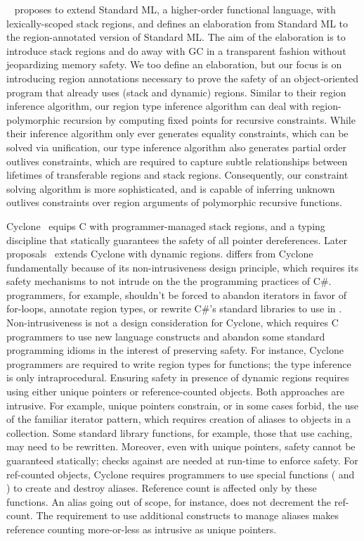 ~\cite{tofte97} proposes to extend Standard ML, a higher-order
functional language, with lexically-scoped stack regions, and defines
an elaboration from Standard ML to the region-annotated version of
Standard ML. The aim of the elaboration is to introduce stack regions
and do away with GC in a transparent fashion without jeopardizing
memory safety. We too define an elaboration, but our focus is on
introducing region annotations necessary to prove the safety of an
object-oriented program that already uses (stack and dynamic) regions.
Similar to their region inference algorithm, our region type inference
algorithm can deal with region-polymorphic recursion by computing
fixed points for recursive constraints. While their inference
algorithm only ever generates equality constraints, which can be
solved via unification, our type inference algorithm also generates
partial order outlives constraints, which are required to capture
subtle relationships between lifetimes of transferable regions and
stack regions. Consequently, our constraint solving algorithm is more
sophisticated, and is capable of inferring unknown outlives
constraints over region arguments of polymorphic recursive functions.

Cyclone~\cite{cyclone02} equips C with programmer-managed stack
regions, and a typing discipline that statically guarantees the safety
of all pointer dereferences. Later
proposals~\cite{cyclone04,cycloneSCP} extends Cyclone with dynamic
regions. \name differs from Cyclone fundamentally because of its
non-intrusiveness design principle, which requires its safety
mechanisms to not intrude on the the programming practices of C\#.
\name programmers, for example, shouldn’t be forced to abandon
iterators in favor of for-loops, annotate region types, or rewrite
C\#'s standard libraries to use in \name.  Non-intrusiveness is not a
design consideration for Cyclone, which requires C programmers to use
new language constructs and abandon some standard programming idioms
in the interest of preserving safety. For instance, Cyclone
programmers are required to write region types for functions; the type
inference is only intraprocedural. Ensuring safety in presence of
dynamic regions requires using either unique pointers or
reference-counted objects.  Both approaches are intrusive. For
example, unique pointers constrain, or in some cases forbid, the use
of the familiar iterator pattern, which requires creation of aliases
to objects in a collection. Some standard library functions, for
example, those that use caching, may need to be rewritten.  Moreover,
even with unique pointers, safety cannot be guaranteed statically;
checks against  are needed at run-time to enforce safety. For
ref-counted objects, Cyclone requires programmers to use special
functions ( and ) to create and
destroy aliases.  Reference count is affected only by these
functions. An alias going out of scope, for instance, does not
decrement the ref-count. The requirement to use additional constructs
to manage aliases makes reference counting more-or-less as intrusive
as unique pointers.

